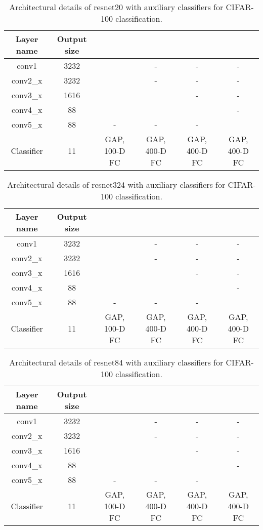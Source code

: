 \documentclass{article}
\begin{document}
\begin{table*}
	\centering
	\begin{tabular}{c|c|c|c|c|c}
		\hline
		Layer name & Output size & & & & \\ 	\hline
		conv1&  3232 &   &-&-&-\\  \hline
		conv2\_x &  3232              & 
		  &  -&  - &  -  \\  \hline
		conv3\_x &  1616           & 
		  &   & - & -  \\  \hline
		conv4\_x &  88           & 
		  &  &  & -  \\  \hline
		conv5\_x &  88           & - &  -&  - &    \\  \hline
		Classifier &  11  &  GAP, 100-D FC&  GAP, 400-D FC &  GAP, 400-D FC&  GAP, 400-D FC  \\  \hline
	\end{tabular}
	\caption{Architectural details of resnet20 with auxiliary classifiers for CIFAR-100 classification.}
	\label{resnet20}
\end{table*}

\begin{table*}
	\centering
	\begin{tabular}{c|c|c|c|c|c}
		\hline
		Layer name & Output size & & & & \\ 	\hline
		conv1&  3232 &   &-&-&-\\  \hline
		conv2\_x &  3232              & 
		  &  -&  - &  -  \\  \hline
		conv3\_x &  1616           & 
		  &   & - & -  \\  \hline
		conv4\_x &  88           & 
		  &  &  & -  \\  \hline
		conv5\_x &  88           & - &  -&  - &    \\  \hline
		Classifier &  11  &  GAP, 100-D FC&  GAP, 400-D FC &  GAP, 400-D FC&  GAP, 400-D FC  \\  \hline
	\end{tabular}
	\caption{Architectural details of resnet324 with auxiliary classifiers for CIFAR-100 classification.}
	\label{resnet32}
\end{table*}

\begin{table*}
	\centering
	\begin{tabular}{c|c|c|c|c|c}
		\hline
		Layer name & Output size & & & & \\ 	\hline
		conv1&  3232 &   &-&-&-\\  \hline
		conv2\_x &  3232              & 
		  &  -&  - &  -  \\  \hline
		conv3\_x &  1616           & 
		  &   & - & -  \\  \hline
		conv4\_x &  88           & 
		  &  &  & -  \\  \hline
		conv5\_x &  88           & - &  -&  - &    \\  \hline
		Classifier &  11  &  GAP, 100-D FC&  GAP, 400-D FC &  GAP, 400-D FC&  GAP, 400-D FC  \\  \hline
	\end{tabular}
	\caption{Architectural details of resnet84 with auxiliary classifiers for CIFAR-100 classification.}
	\label{resnet8}
\end{table*}
\end{document}
